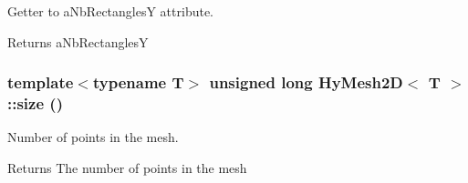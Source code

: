 Getter to aNbRectanglesY attribute. 

\begin{DoxyReturn}{Returns}
aNbRectanglesY 
\end{DoxyReturn}
\hypertarget{classHyMesh2D_a109323e7c482899df86c76102ff3a5e8}{
\subsubsection[{size}]{\setlength{\rightskip}{0pt plus 5cm}template$<$typename T$>$ unsigned long {\bf HyMesh2D}$<$ T $>$::size ()}}
\label{classHyMesh2D_a109323e7c482899df86c76102ff3a5e8}


Number of points in the mesh. 

\begin{DoxyReturn}{Returns}
The number of points in the mesh 
\end{DoxyReturn}



